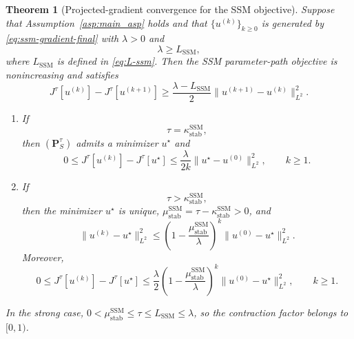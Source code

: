 \documentclass[11pt]{amsart}
\numberwithin{equation}{section} %
\newtheorem{theorem}{Theorem}[section]
\theoremstyle{remark}
\begin{document}
\begin{theorem}[Projected-gradient convergence for the SSM objective]
\label{thm:ssm-gradient-convergence}
Suppose that Assumption~\ref{asp:main_asp} holds and that
$\{u^{(k)}\}_{k\ge0}$ is generated by
\eqref{eq:ssm-gradient-final} with $\lambda>0$ and
\begin{equation}
\label{eq:ssm-step-condition}
\lambda\ge L_{\mathrm{SSM}},
\end{equation}
where $L_{\mathrm{SSM}}$ is defined in \eqref{eq:L-ssm}.
Then the SSM parameter-path objective is nonincreasing and satisfies
\begin{equation}
\label{eq:ssm-main-dissipation}
J^\tau[u^{(k)}]-J^\tau[u^{(k+1)}]
\ge\frac{\lambda-L_{\mathrm{SSM}}}{2}
\|u^{(k+1)}-u^{(k)}\|_{L^2}^2.
\end{equation}

\begin{enumerate}
\item If
\begin{equation}
\label{eq:ssm-critical-tau}
\tau=\kappa_{\mathrm{stab}}^{\mathrm{SSM}},
\end{equation}
then $(\mathbf P_S^\tau)$ admits a minimizer $u^\star$ and
\begin{equation}
\label{eq:ssm-O1k}
0\le J^\tau[u^{(k)}]-J^\tau[u^\star]
\le\frac{\lambda}{2k}\|u^\star-u^{(0)}\|_{L^2}^2,
\qquad k\ge1.
\end{equation}
\item If
\begin{equation}
\label{eq:ssm-tau-threshold}
\boxed{\tau>\kappa_{\mathrm{stab}}^{\mathrm{SSM}}},
\end{equation}
then the minimizer $u^\star$ is unique,
$\mu_{\mathrm{stab}}^{\mathrm{SSM}}
=\tau-\kappa_{\mathrm{stab}}^{\mathrm{SSM}}>0$, and
\begin{equation}
\label{eq:ssm-control-geometric}
\|u^{(k)}-u^\star\|_{L^2}^2
\le\left(1-\frac{\mu_{\mathrm{stab}}^{\mathrm{SSM}}}{\lambda}\right)^k
\|u^{(0)}-u^\star\|_{L^2}^2.
\end{equation}
Moreover,
\begin{equation}
\label{eq:ssm-objective-geometric}
0\le J^\tau[u^{(k)}]-J^\tau[u^\star]
\le\frac{\lambda}{2}
\left(1-\frac{\mu_{\mathrm{stab}}^{\mathrm{SSM}}}{\lambda}\right)^{k}
\|u^{(0)}-u^{\star}\|_{L^2}^2,
\qquad k\ge1.
\end{equation}
\end{enumerate}
In the strong case,
$0<\mu_{\mathrm{stab}}^{\mathrm{SSM}}\le\tau
\le L_{\mathrm{SSM}}\le\lambda$, so the contraction factor belongs
to $[0,1)$.
\end{theorem}
\end{document}
